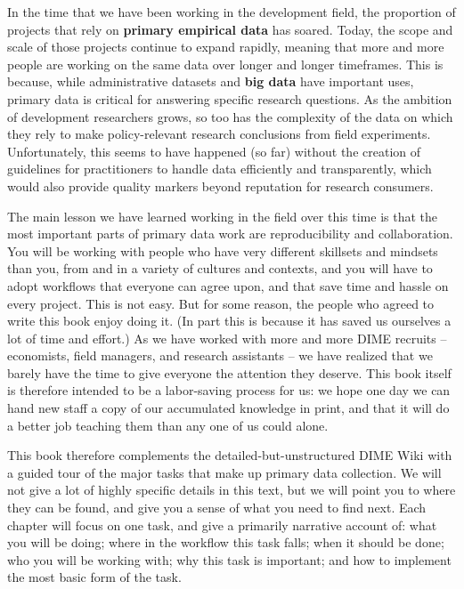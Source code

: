 In the time that we have been working in the development field,
the proportion of projects that rely on \textbf{primary empirical data} has soared.\cite{angrist2017economic}
Today, the scope and scale of those projects continue to expand rapidly,
meaning that more and more people are working on the same data over longer and longer timeframes.
This is because, while administrative datasets
and \textbf{big data} have important uses,
primary data 
is critical for answering specific research questions.\cite{levitt2009field}
As the ambition of development researchers grows, so too has the complexity of the data
on which they rely to make policy-relevant research conclusions from field experiments.
Unfortunately, this seems to have happened (so far) without the creation of 
guidelines for practitioners to handle data efficiently and transparently,
which would also provide quality markers beyond reputation for research consumers.

The main lesson we have learned working in the field over this time is that
the most important parts of primary data work are reproducibility and collaboration.
You will be working with people 
who have very different skillsets and mindsets than you,
from and in a variety of cultures and contexts, and you will have to adopt workflows
that everyone can agree upon, and that save time and hassle on every project.
This is not easy. But for some reason, the people who agreed to write this book enjoy doing it.
(In part this is because it has saved us ourselves a lot of time and effort.)
As 
we have worked with more and more DIME recruits
-- economists, field managers, and research assistants --
we have realized that we barely have the time to give everyone the attention they deserve.
This book itself is therefore intended to be a labor-saving process for us:
we hope one day we can hand new staff a copy of our accumulated knowledge in print,
and that it will do a better job teaching them than any one of us could alone.

This book therefore complements the detailed-but-unstructured DIME Wiki
with a guided tour of the major tasks that make up primary data collection.
We will not give a lot of highly specific details in this text,
but we will point you to where they can be found,
and give you a sense of what you need to find next.
Each chapter will focus on one task,
and give a primarily narrative account of:
what you will be doing; where in the workflow this task falls;
when it should be done; who you will be working with;
why this task is important; and how to implement the most basic form of the task.


